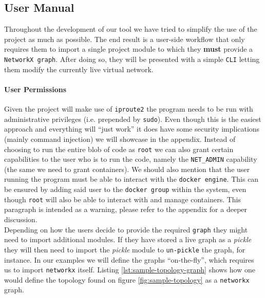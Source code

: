         \subsection{User Manual}
            Throughout the development of our tool we have tried to simplify the use of the project as much as possible. The end result is a user-side workflow that only requires them to import a single project module to which they \textbf{must} provide a \texttt{NetworkX graph}. After doing so, they will be presented with a simple \texttt{CLI} letting them modify the currently live virtual network.\\

            \paragraph{User Permissions}
                Given the project will make use of \texttt{iproute2} the program needs to be run with administrative privileges (i.e. prepended by \texttt{sudo}). Even though this is the easiest approach and everything will ``just work'' it does have some security implications (mainly command injection) we will showcase in the appendix. Instead of choosing to run the entire blob of code as \texttt{root} we can also grant certain capabilities to the user who is to run the code, namely the \texttt{NET\_ADMIN} capability (the same we need to grant containers). We should also mention that the user running the program must be able to interact with the \texttt{docker engine}. This can be ensured by adding said user to the \texttt{docker group} within the system, even though \texttt{root} will also be able to interact with and manage containers. This paragraph is intended as a warning, please refer to the appendix for a deeper discussion.\\

            Depending on how the users decide to provide the required \texttt{graph} they might need to import additional modules. If they have stored a live graph as a \textit{pickle} \cite{bib:python-pickle} they will then need to import the \textit{pickle} module to \texttt{un-pickle} the graph, for instance. In our examples we will define the graphs ``on-the-fly'', which requires us to import \texttt{networkx} itself. Listing \ref{lst:sample-topology-graph} shows how one would define the topology found on figure \ref{fig:sample-topology} as a \texttt{networkx} graph.\\

